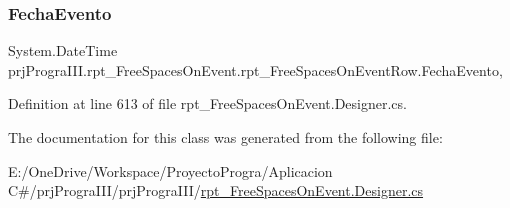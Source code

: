 \subsubsection{\texorpdfstring{Fecha\+Evento}{FechaEvento}}
{\footnotesize\ttfamily System.\+Date\+Time prj\+Progra\+I\+I\+I.\+rpt\+\_\+\+Free\+Spaces\+On\+Event.\+rpt\+\_\+\+Free\+Spaces\+On\+Event\+Row.\+Fecha\+Evento\hspace{0.3cm}{\ttfamily [get]}, {\ttfamily [set]}}



Definition at line 613 of file rpt\+\_\+\+Free\+Spaces\+On\+Event.\+Designer.\+cs.



The documentation for this class was generated from the following file\+:\begin{DoxyCompactItemize}
\item 
E\+:/\+One\+Drive/\+Workspace/\+Proyecto\+Progra/\+Aplicacion C\#/prj\+Progra\+I\+I\+I/prj\+Progra\+I\+I\+I/\hyperlink{rpt___free_spaces_on_event_8_designer_8cs}{rpt\+\_\+\+Free\+Spaces\+On\+Event.\+Designer.\+cs}\end{DoxyCompactItemize}
